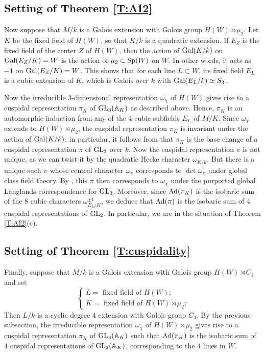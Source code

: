 \documentclass[11pt]{amsart}
\theoremstyle{plain}
\numberwithin{equation}{section}
\newcommand{\A}{\mathbb A}
\def\Sp{{\rm Sp}}
\def\GL{{\rm GL}}
\def\Sp{{\rm Sp}}
\def\A{{\mathbb A}}
\begin{document}
\vskip 5pt

\subsection{\bf Setting of Theorem \ref{T:AI2}}
Now suppose that $M/k$ is a Galois extension with Galois group $H(W) \rtimes \mu_2$. Let $K$ be the fixed field of $H(W)$, so that $K/k$ is a quadratic extension. If $E_Z$ is the fixed field of the center $Z$ of $H(W)$, then the action of ${\rm Gal}(K/k)$ on ${\rm Gal}(E_Z/K) =W$ is the action of $\mu_2 \subset \Sp(W)$ on $W$. In other words, it acts as $-1$ on ${\rm Gal}(E_Z/K) = W$. This shows that for each line $L \subset W$, its fixed field $E_L$ is a cubic extension of $K$, which is Galois over $k$ with ${\rm Gal}(E_L/k) \simeq S_3$. 
\vskip 5pt

 Now the irreducible 3-dimensional representation $\omega_{\chi}$ of $H(W)$ 
gives rise to a cuspidal representation $\pi_K$ of $\GL_3(\A_K)$ as described above. Hence, $\pi_K$ is an automorphic induction from any of the 4 cubic subfields $E_L$ of  $M/K$. 
Since $\omega_{\chi}$  extends to $H(W) \rtimes \mu_2$, the cuspidal representation $\pi_K$ is invariant under the action of ${\rm Gal}(K/k)$; in particular, it follows from \cite{AC} that $\pi_K$ is the base change  of a cuspidal representation  $\pi$ of $\GL_3$ over $k$.  Now the cuspidal representation $\pi$ is not unique, as we can twist it by the quadratic Hecke character $\omega_{K/k}$.
But there is a unique such $\pi$ whose central character $\omega_{\pi}$ corresponds to $\det \omega_{\chi}$ under global class field theory. 
By  \cite[\S 5, Prop. 2]{L2}, this $\pi$ then corresponds to $\omega_{\chi}$ under the purported global Langlands correspondence for $\GL_3$. 
Moreover, since ${\rm Ad}(\pi_K)$ is the isobaric sum of the 8 cubic characters $\omega_{E_L/K}^{\pm 1}$, we deduce that ${\rm Ad}(\pi)$ is the isobaric sum of 4 cuspidal representations of $\GL_2$. In particular, we are in the situation of Theorem \ref{T:AI2}(c).  
\vskip 5pt

 

\vskip 5pt

\subsection{\bf Setting of Theorem \ref{T:cuspidality}}
Finally, suppose that $M/k$ is a Galois extension with Galois group $H(W) \rtimes C_4$ and set
\[  \begin{cases}
  L  = \text{  fixed field of $H(W)$;} \\
  K = \text{ fixed field of $H(W) \rtimes \mu_2$;} \end{cases} \]
  Then $L/k$ is a cyclic degree $4$ extension with Galois group $C_4$. 
  By the previous subsection,  the irreducible representation $\omega_{\chi}$ of $H(W) \rtimes \mu_2$ gives rise to a cuspidal representation $\pi_K$ of $\GL_3(\A_K)$ such that ${\rm Ad}(\pi_K)$ is the isobaric sum of 4 cuspidal representations of $\GL_2(\A_K)$, corresponding to the 4  lines in $W$.
 \vskip 5pt
 
\end{document}
